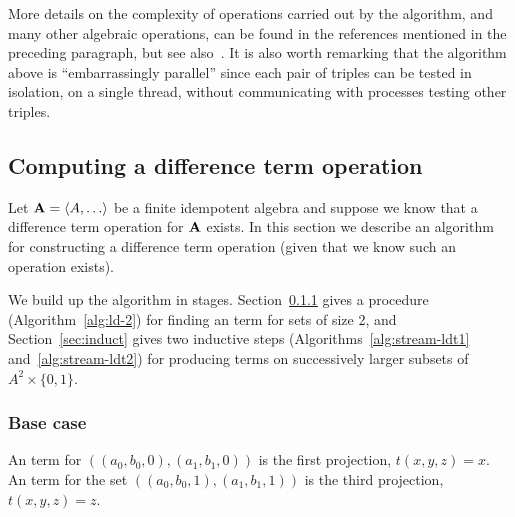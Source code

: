 More details on the complexity of operations carried out by the algorithm, and
many other algebraic operations, can be found in the references mentioned in the
preceding paragraph, but see also~\cite{MR1871085,MR1695293,Freese:2009}.
It is also worth remarking that the algorithm above is ``embarrassingly parallel''
since each pair of triples can be tested in isolation, on a single thread,
without communicating with processes testing other triples.

\subsection{Computing a difference term operation}
\label{sec:comp-diff-term}
Let $\alg{A} = \<A, \dots\>$ be a finite idempotent algebra and suppose we 
know that a difference term operation for $\mathbf{A}$ exists.  In this section we
describe an algorithm for constructing a difference term operation
(given that we know such an operation exists). 

We build up the algorithm in stages. Section~\ref{sec:size2}
gives a procedure (Algorithm~\ref{alg:ld-2}) for finding an \ld term for sets 
of size 2, and Section~\ref{sec:induct} gives two inductive steps 
(Algorithms~\ref{alg:stream-ldt1} and~\ref{alg:stream-ldt2}) 
for producing \ld terms on successively larger subsets of $A^2 \times \{0,1\}$.

\subsubsection{Base case}
\label{sec:size2}
An \ld term for
$((a_0,b_0,0), (a_1, b_1, 0))$ is the first projection,
$t(x,y,z) = x$.
An \ld term for
the set $((a_0,b_0,1), (a_1, b_1, 1))$ is the third projection,
$t(x,y,z) = z$.
\begin{comment}
\footnote{Moreover, if $a_0 = b_0$, then by idempotence every ternary term $t$ 
satisfies $t(a_0, b_0, b_0) = a_0$; therefore, the third projection is an \ld 
term for the set $((a_0,b_0,\chi_0), (a_1, b_1, \chi_1))$, 
for all $\chi_0$, $\chi_1$ in $\{0,1\}$. 
Similarly, if $a_1 = b_1$, then $t(a_1, a_1, b_1) = b_1$ for all ternary $t$, 
so the third projection is an \ld term.
Therefore, we need only consider sets of the form
$((a_0,b_0, 0), (a_1, b_1, 1))$, where $a_0 \neq b_0$ and $a_1 \neq b_1$.  
We have relegated this observation to a footnote because it yields a
computational that does not impact the overall complexity of the main
algorithm.} 
\end{comment}

